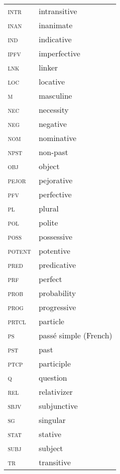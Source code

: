 \begin{tabularx}{.5\textwidth}{>{\scshape}lQ@{}} 
intr & intransitive\\
inan & inanimate\\
ind & indicative\\
ipfv & imperfective\\
lnk & linker\\
loc & locative\\
m & masculine\\
nec & necessity\\
neg & negative\\
nom & nominative\\
npst & non-past\\
obj & object\\
pejor & pejorative\\
pfv & perfective\\
pl & plural\\
pol & polite\\
poss & possessive\\
potent & potentive\\
pred & predicative\\
prf & perfect\\
prob & probability\\
prog & progressive\\
prtcl & particle\\
ps & passé simple (French)\\
pst & past\\
ptcp & participle\\
q & question\\
rel & relativizer\\
sbjv & subjunctive\\
sg & singular\\
stat & stative\\
subj & subject\\
tr & transitive\\
\end{tabularx}
